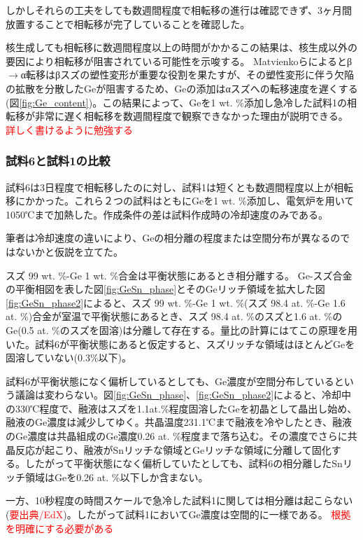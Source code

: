 しかしそれらの工夫をしても数週間程度で相転移の進行は確認できず、3ヶ月間放置することで相転移が完了していることを確認した。

核生成しても相転移に数週間程度以上の時間がかかるこの結果は、核生成以外の要因により相転移が阻害されている可能性を示唆する。
Matvienkoら\cite{Matvienko}によるとβ$\to$α転移はβスズの塑性変形が重要な役割を果たすが、その塑性変形に伴う欠陥の拡散を分散したGeが阻害するため、Geの添加はαスズへの転移速度を遅くする(図\ref{fig:Ge_content})。この結果によって、Geを1 wt. \%添加し急冷した試料1の相転移が非常に遅く相転移を数週間程度で観察できなかった理由が説明できる。
\textcolor{red}{詳しく書けるように勉強する}

\subsubsection{試料6と試料1の比較}
試料6は3日程度で相転移したのに対し、試料1は短くとも数週間程度以上が相転移にかかった。これら２つの試料はともにGeを1 wt. \%添加し、電気炉を用いて1050℃まで加熱した。作成条件の差は試料作成時の冷却速度のみである。

筆者は冷却速度の違いにより、Geの相分離の程度または空間分布が異なるのではないかと仮説を立てた。

スズ 99 wt. \%-Ge 1 wt. \%合金は平衡状態にあるとき相分離する。
Ge-スズ合金の平衡相図を表した図\ref{fig:GeSn_phase}とそのGeリッチ領域を拡大した図\ref{fig:GeSn_phase2}によると、スズ 99 wt. \%-Ge 1 wt. \%(スズ 98.4 at. \%-Ge 1.6 at. \%)合金が室温で平衡状態にあるとき、スズ 98.4 at. \%のスズと1.6 at. \%のGe(0.5 at. \%のスズを固溶)は分離して存在する。量比の計算にはてこの原理を用いた。試料6が平衡状態にあると仮定すると、スズリッチな領域はほとんどGeを固溶していない(0.3\%以下\cite{Thurmond1960})。

試料6が平衡状態になく偏析しているとしても、Ge濃度が空間分布しているという議論は変わらない。図\ref{fig:GeSn_phase}、\ref{fig:GeSn_phase2}によると、冷却中の330℃程度で、融液はスズを1.1at.\%程度固溶したGeを初晶として晶出し始め、融液のGe濃度は減少してゆく。共晶温度231.1℃まで融液を冷やしたとき、融液のGe濃度は共晶組成のGe濃度0.26 at. \%程度\cite{Thurmond1960}まで落ち込む。その濃度でさらに共晶反応が起こり、融液がSnリッチな領域とGeリッチな領域に分離して固化する。したがって平衡状態になく偏析していたとしても、試料6の相分離したSnリッチ領域はGeを0.26 at. \%以下しか含まない。

一方、10秒程度の時間スケールで急冷した試料1に関しては相分離は起こらない(\textcolor{red}{要出典/EdX})。したがって試料1においてGe濃度は空間的に一様である。
\textcolor{red}{根拠を明確にする必要がある}

